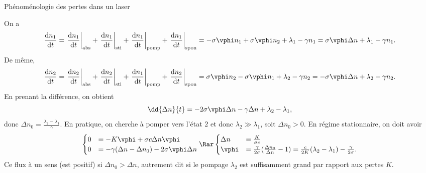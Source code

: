 \begin{exo}[PC][1][TD]{Phénoménologie des pertes dans un laser}
\begin{quest}
{On a
$$
\frac{\mathrm{d} n_1}{\mathrm{d} t}  = \left. \frac{\mathrm{d} n_1}{\mathrm{d} t}\right|_{\text{abs}}  + \left. \frac{\mathrm{d} n_1}{\mathrm{d} t}\right|_{\text{sti}}  + \left. \frac{\mathrm{d} n_1}{\mathrm{d} t}\right|_{\text{pomp}}  + \left. \frac{\mathrm{d} n_1}{\mathrm{d} t}\right|_{\text{spon}}  =  -\sigma \vphi n_1 + \sigma \vphi n_2 + \lambda_1 - \gamma n_1 = \sigma \vphi \Delta n + \lambda_1 - \gamma n_1.
$$
De même,
$$
\frac{\mathrm{d} n_2}{\mathrm{d} t}  = \left. \frac{\mathrm{d} n_2}{\mathrm{d} t}\right|_{\text{abs}}  + \left. \frac{\mathrm{d} n_2}{\mathrm{d} t}\right|_{\text{sti}}  + \left. \frac{\mathrm{d} n_1}{\mathrm{d} t}\right|_{\text{pomp}}  + \left. \frac{\mathrm{d} n_2}{\mathrm{d} t}\right|_{\text{spon}}  =  \sigma \vphi n_2 - \sigma \vphi n_1 + \lambda_2 - \gamma n_2 = -\sigma \vphi \Delta n + \lambda_2 - \gamma n_2.
$$
En prenant la différence, on obtient
$$
\dd{\Delta n}{t} = -2\sigma \vphi \Delta n - \gamma \Delta n +  \lambda_2- \lambda_1,
$$
donc $\Delta n_0 = \frac{\lambda_2-\lambda_1}{\gamma}$. En pratique, on cherche à pomper vers l'état $2$ et donc $\lambda_2 \gg \lambda_1$, soit $\Delta n_0 >0$. En régime stationnaire, on doit avoir
$$
\begin{cases}
 0 & = -K \vphi + \sigma c \Delta n \vphi \\
 0 & = -\gamma(\Delta n-\Delta n_0) - 2\sigma \vphi \Delta n \\
\end{cases}
\Rar
\begin{cases}
 \Delta n  & = \frac{K}{\sigma c}\\
  \vphi & = \frac{\gamma}{2 \sigma}(\frac{\Delta n_0}{\Delta n}-1) = \frac{c}{2 K}(\lambda_2-\lambda_1) - \frac{\gamma}{2\sigma}.\\
\end{cases}
$$
Ce flux à un sens (est positif) si $\Delta n_0 > \Delta n$, autrement dit si le pompage $\lambda_2$ est suffisamment grand par rapport aux pertes $K$.
}

\end{quest}
\end{exo}



